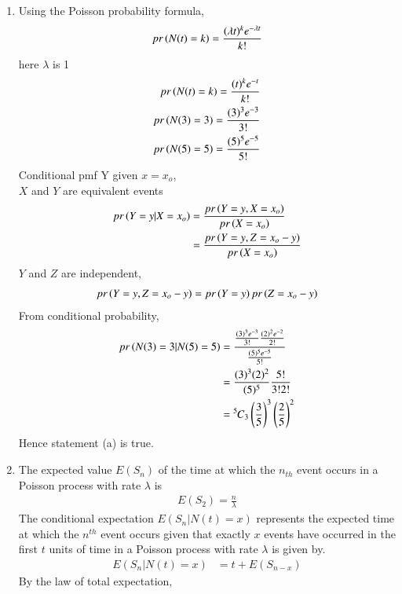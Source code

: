 \documentclass[journal,12pt,twocolumn]{IEEEtran}
\theoremstyle{remark}
\begin{document}
\begin{enumerate}[label=(\alph*)]
\item Using the Poisson probability formula,\\
 \begin{align}
 pr\left(N(t)=k\right) = \frac{(\lambda t)^k e^{-\lambda t}}{k!} 
  \end{align}
 here $\lambda$ is 1 
 \begin{align}
 pr\left(N(t)=k\right) = \frac{(t)^k e^{-t}}{k!}\\
 pr\left(N(3)=3\right) = \frac{(3)^3 e^{-3}}{3!}\\
 pr\left(N(5)=5\right) = \frac{(5)^5 e^{-5}}{5!}
 \end{align}
 Conditional pmf Y given ${x=x_o}$,\\
 $X$ and $Y$ are equivalent events\\
  \begin{align}
 pr\left(Y=y|X=x_o\right)&=\frac{pr\left(Y=y,X=x_o\right)}{pr\left(X=x_o\right)}\\
 &=\frac{pr\left(Y=y,Z=x_o-y\right)}{pr\left(X=x_o\right)} 
  \end{align}
  $Y$ and $Z$ are independent,
  \begin{align}
  pr\left(Y=y,Z=x_o-y\right)=pr\left(Y=y\right)pr\left(Z=x_o-y\right)
  \end{align}
 From conditional probability,
  \begin{align}
 pr\left(N(3)=3|N(5)=5\right)&=\frac{\frac{(3)^3 e^{-3}}{3!}\frac{(2)^2 e^{-2}}{2!}}{\frac{(5)^5 e^{-5}}{5!}}\\
 &=\frac{(3)^3(2)^2}{(5)^5}\frac{5!}{3!2!}\\
 &={{}^{5}\mkern-1muC_{3}}\left(\frac{3}{5}\right)^3 \left(\frac{2}{5}\right)^2
 \end{align}
 Hence statement (a) is true.
\item The expected value $E(S_n)$ of the time at which the $n_{th}$ event occurs in a Poisson process with rate $\lambda$ is\\
\begin{align}
E(S_2)=\frac{n}{\lambda}
\end{align}
The conditional expectation $E(S_n|N(t)=x)$ represents the expected time at which the $n^{th}$ event occurs given that exactly $x$ events have occurred in the first $t$ units of time in a Poisson process with rate $\lambda$ is given by.\\
\begin{align}
E(S_n|N(t)=x)&=t+E(S_{n-x})
\end{align}
By the law of total expectation,
\begin{align}

\end{align}
\end{enumerate}
\end{document}

